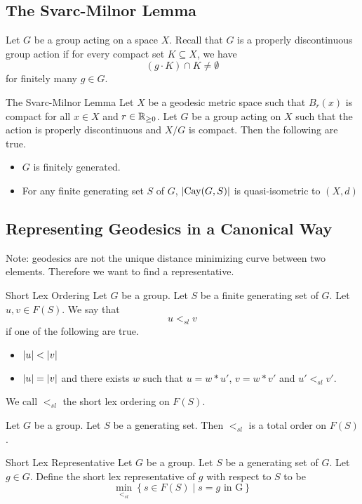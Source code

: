\documentclass[a4paper]{article}
\begin{document}
\subsection{The Svarc-Milnor Lemma}
Let $G$ be a group acting on a space $X$. Recall that $G$ is a properly discontinuous group action if for every compact set $K\subseteq X$, we have $$(g\cdot K)\cap K\neq\emptyset$$ for finitely many $g\in G$. 

\begin{thm}{The Svarc-Milnor Lemma}{} Let $X$ be a geodesic metric space such that $B_r(x)$ is compact for all $x\in X$ and $r\in\mathbb{R}_{\geq 0}$. Let $G$ be a group acting on $X$ such that the action is properly discontinuous and $X/G$ is compact. Then the following are true. 
\begin{itemize}
\item $G$ is finitely generated. 
\item For any finite generating set $S$ of $G$, $\abs{\text{Cay}(G,S)}$ is quasi-isometric to $(X,d)$
\end{itemize}
\end{thm}

\subsection{Representing Geodesics in a Canonical Way}
Note: geodesics are not the unique distance minimizing curve between two elements. Therefore we want to find a representative. 

\begin{defn}{Short Lex Ordering}{} Let $G$ be a group. Let $S$ be a finite generating set of $G$. Let $u,v\in F(S)$. We say that $$u<_{sl}v$$ if one of the following are true. 
\begin{itemize}
\item $\abs{u}<\abs{v}$
\item $\abs{u}=\abs{v}$ and there exists $w$ such that $u=w\ast u'$, $v=w\ast v'$ and $u'<_{sl}v'$. 
\end{itemize}
We call $<_{sl}$ the short lex ordering on $F(S)$. 
\end{defn}

\begin{lmm}{}{} Let $G$ be a group. Let $S$ be a generating set. Then $<_{sl}$ is a total order on $F(S)$. 
\end{lmm}

\begin{defn}{Short Lex Representative}{} Let $G$ be a group. Let $S$ be a generating set of $G$. Let $g\in G$. Define the short lex representative of $g$ with respect to $S$ to be $$\min_{<_{sl}}\left\{s\in F(S)\;|\;s=g\text{ in G}\right\}$$
\end{defn}
\end{document}
